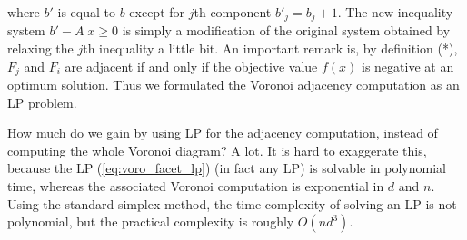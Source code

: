 \documentclass[a4paper,12pt]{article}
\begin{document}
\noindent
where $b'$ is equal to $b$ except for $j$th component
$b'_j = b_j + 1$.  The new inequality system  $b' - A \; x \ge 0$
is simply a modification of the original system 
obtained by relaxing the $j$th inequality a little bit.
An important remark is, by definition (*), $F_j$ and $F_i$
are adjacent if and only if the objective value $f(x)$
is negative at an optimum solution.  Thus we formulated
the Voronoi adjacency computation as an LP problem.

How much do we gain by using LP for the adjacency computation, instead
of computing the whole Voronoi diagram?
A lot.   It is hard to exaggerate this, because the LP (\ref{eq:voro_facet_lp})
(in fact any LP) is solvable in polynomial time, 
whereas the associated Voronoi computation is exponential in
$d$ and $n$.  Using the standard simplex method, the time complexity of solving
an LP is not polynomial, but the practical complexity is roughly
$O(n  d^3)$.
\end{document}
